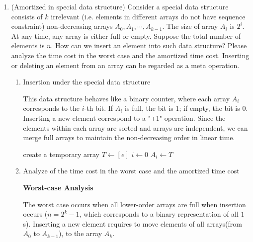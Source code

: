 \documentclass[12pt,a4paper]{article}
\theoremstyle{definition}
\begin{document}
\begin{enumerate}
  \item {\color{purple}(Amortized
   in special data structure)} Consider a special data structure consists of $k$ irrelevant (i.e. elements in different arrays do not have sequence constraint) non-decreasing arrays $A_0, A_1, \cdots, A_{k-1}$. The size of array $A_i$ is $2^i$. At any time, any array is either full or empty. Suppose the total number of elements is $n$. How can we insert an element into such data structure? Please analyze the time cost in the worst case and the amortized time cost. Inserting or deleting an element from an array can be regarded as a meta operation.

        
    \begin{enumerate}
        \item Insertion under the special data structure
        
        This data structure behaves like a binary counter, where each array $A_i$ corresponds to the $i$-th bit. If $A_i$ is full, the bit is $1$; if empty, the bit is $0$. Inserting a new element correspond to a "+1" operation. Since the elements within each array are sorted and arrays are independent, we can merge full arrays to maintain the non-decreasing order in linear time.
        
        \begin{algorithm}[H]
            \LinesNumbered
            \BlankLine
            \caption{Special Structure Insertion} \label{Algorithm 2}
            
            create a temporary array $T \leftarrow [e]$\;
            $i \leftarrow 0$\;
            $A_i \leftarrow T$ 
        \end{algorithm}
        
        \item Analyze of the time cost in the worst case and the amortized time cost
        
        \textbf{Worst-case Analysis}
        
        The worst case occurs when all lower-order arrays are full when insertion occurs ($n = 2^k - 1$, which corresponds to a binary representation of all $1$s). Inserting a new element requires to move elements of all arrays(from $A_0$ to $A_{k-1}$), to the array $A_k$.
        

\end{enumerate}
\end{enumerate}
\end{document}
